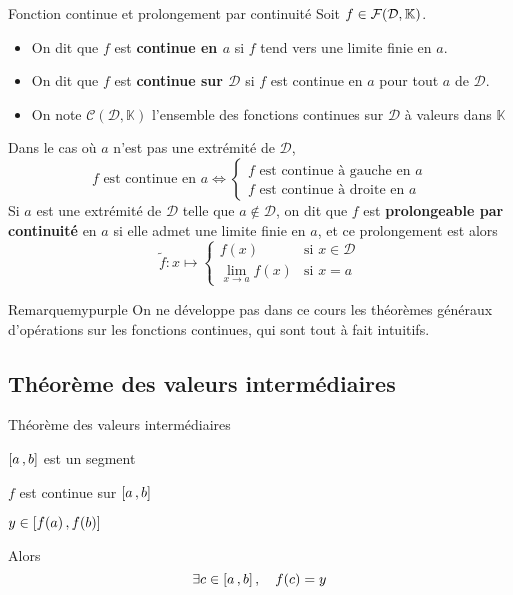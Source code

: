     \begin{defitheo}{Fonction continue et prolongement par continuité}{}
        Soit $f \in \mathcal{F}(\mathcal{D},\mathbb{K})$.
        \begin{itemize}
            \item On dit que $f$ est \textbf{continue en $a$} si $f$ tend vers une limite finie en $a$.
            \item On dit que $f$ est \textbf{continue sur $\mathcal{D}$} si $f$ est continue en $a$ pour tout $a$ de $\mathcal{D}$.
            \item On note $\mathcal{C}(\mathcal{D}, \mathbb{K})$ l’ensemble des fonctions continues sur $\mathcal{D}$ à valeurs dans $\mathbb{K}$
        \end{itemize}
        Dans le cas où $a$ n’est pas une extrémité de $\mathcal{D}$, 
        \[ f \text{ est continue en } a \iff \left\{ \begin{array}{l}
            f \text{ est continue à gauche en } a \\
            f \text{ est continue à droite en } a
        \end{array} \right. \]
        Si $a$ est une extrémité de $\mathcal{D}$ telle que $a \notin \mathcal{D}$, on dit que  $f$ est \textbf{prolongeable par continuité} en $a$ si elle admet une limite finie en $a$, et ce prolongement est alors 
        \[ {\widetilde{f} : x \mapsto \left\{ \begin{array}{cl}
            f(x) & \text{si } x \in \mathcal{D} \\
            \underset{x \rightarrow a}{\lim}f(x) & \text{si } x = a
        \end{array} \right.} \]
    \end{defitheo}

    \begin{omed}{Remarque}{mypurple}
        On ne développe pas dans ce cours les théorèmes généraux d’opérations sur les fonctions continues, qui sont tout à fait intuitifs.
    \end{omed}

\subsection{Théorème des valeurs intermédiaires}

    \begin{theo}{Théorème des valeurs intermédiaires}{}
        \begin{suppose}
            \item $\left[ a \, , b \right]$ est un segment
            \item $f$ est continue sur $\left[ a \, , b \right]$
            \item $y \in  \left[ f(a) \, , f(b) \right]$
        \end{suppose}
        Alors \[ \exists c \in \left[ a \, , b \right], \quad f(c) = y \]
    \end{theo}

